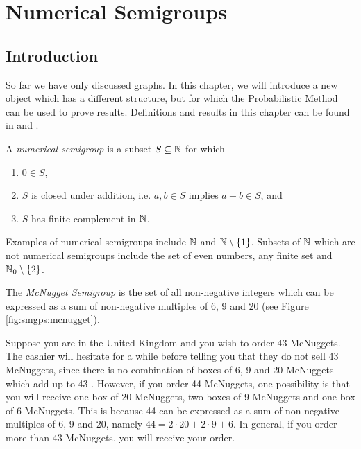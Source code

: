 \chapter{Numerical Semigroups}\label{chap:numsems}

\section{Introduction}\label{sec:smgps:intro}

So far we have only discussed graphs. In this chapter, we will introduce a new object which has a different structure, but for which the Probabilistic Method can be used to prove results. Definitions and results in this chapter can be found in \cite{rosales2009numerical} and \cite{assi2020numerical}. \par

\begin{definition}\label{def:smgps}
    A \textit{numerical semigroup} is a subset $S \subseteq \mathbb{N}$ for which 
    \begin{enumerate}
        \item $0 \in S$,
        \item $S$ is closed under addition, i.e. $a, b \in S$ implies $a + b \in S$, and
        \item $S$ has finite complement in $\mathbb{N}$.
    \end{enumerate}
\end{definition}

Examples of numerical semigroups include $\mathbb{N}$ and $\mathbb{N}\setminus \{1\}$. Subsets of $\mathbb{N}$ which are not numerical semigroups include the set of even numbers, any finite set and $\mathbb{N}_0 \setminus \{2\}$. 

\begin{example}\label{ex:smgps:mcnugget}
    The \textit{McNugget Semigroup} is the set of all non-negative integers which can be expressed as a sum of non-negative multiples of 6, 9 and 20 (see Figure \ref{fig:smgps:mcnugget}).
\end{example}

Suppose you are in the United Kingdom and you wish to order 43 McNuggets. The cashier will hesitate for a while before telling you that they do not sell 43 McNuggets, since there is no combination of boxes of 6, 9 and 20 McNuggets which add up to 43 \cite{youtube}. However, if you order 44 McNuggets, one possibility is that you will receive one box of 20 McNuggets, two boxes of 9 McNuggets and one box of 6 McNuggets. This is because 44 can be expressed as a sum of non-negative multiples of 6, 9 and 20, namely $44 = 2 \cdot 20 + 2 \cdot 9 + 6$. In general, if you order more than 43 McNuggets, you will receive your order. \par

